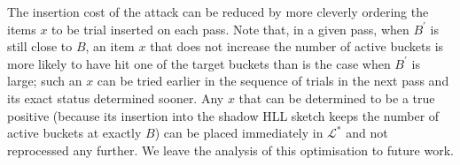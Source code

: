 \documentclass[sigconf, anonymous, dvipsnames]{acmart} %
\begin{document}
The insertion cost of the attack can be reduced by more cleverly ordering the items $x$ to be trial inserted on each pass. Note that, in a given pass, when $B^\prime$ is still close to $B$, an item $x$ that does not increase the number of active buckets is more likely to have hit one of the target buckets than is the case when $B^\prime$ is large; such an $x$ can be tried earlier in the sequence of trials in the next pass and its exact status determined sooner. Any $x$ that can be determined to be a true positive (because its insertion into the shadow HLL sketch keeps the number of active buckets at exactly $B$) can be placed immediately in ${\mathcal{L}}^*$ and not reprocessed any further. We leave the analysis of this optimisation to future work.  


\end{document}
